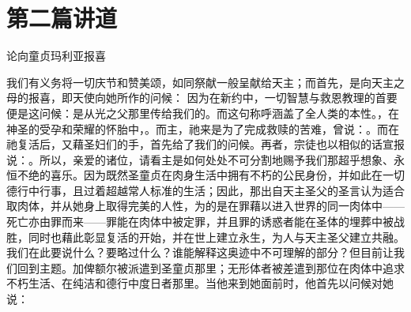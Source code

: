 

\section{第二篇讲道}

论向童贞玛利亚报喜\par

我们有义务将一切庆节和赞美颂，如同祭献一般呈献给天主；而首先，是向天主之母的报喜，即天使向她所作的问候： 因为在新约中，一切智慧与救恩教理的首要便是这问候：是从光之父那里传给我们的。而这句称呼涵盖了全人类的本性。，在神圣的受孕和荣耀的怀胎中，。而主，祂来是为了完成救赎的苦难，曾说：。而在祂复活后，又藉圣妇们的手，首先给了我们的问候。再者，宗徒也以相似的话宣报说：。所以，亲爱的诸位，请看主是如何处处不可分割地赐予我们那超乎想象、永恒不绝的喜乐。因为既然圣童贞在肉身生活中拥有不朽的公民身份，并如此在一切德行中行事，且过着超越常人标准的生活；因此，那出自天主圣父的圣言认为适合取肉体，并从她身上取得完美的人性，为的是在罪藉以进入世界的同一肉体中——死亡亦由罪而来——罪能在肉体中被定罪，并且罪的诱惑者能在圣体的埋葬中被战胜，同时也藉此彰显复活的开始，并在世上建立永生，为人与天主圣父建立共融。我们在此要说什么？要略过什么？谁能解释这奥迹中不可理解的部分？但目前让我们回到主题。加俾额尔被派遣到圣童贞那里；无形体者被差遣到那位在肉体中追求不朽生活、在纯洁和德行中度日者那里。当他来到她面前时，他首先以问候对她说： 